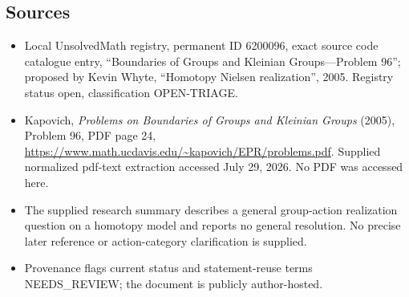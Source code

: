 \documentclass[11pt]{article}
\begin{document}
\subsection{Sources}
\begin{itemize}
\item Local UnsolvedMath registry, permanent ID 6200096, exact source code catalogue entry, ``Boundaries of Groups and Kleinian Groups---Problem 96''; proposed by Kevin Whyte, ``Homotopy Nielsen realization'', 2005. Registry status open, classification OPEN-TRIAGE.
\item Kapovich, \emph{Problems on Boundaries of Groups and Kleinian Groups} (2005), Problem 96, PDF page 24, \url{https://www.math.ucdavis.edu/~kapovich/EPR/problems.pdf}. Supplied normalized pdf-text extraction accessed July 29, 2026. No PDF was accessed here.
\item The supplied research summary describes a general group-action realization question on a homotopy model and reports no general resolution. No precise later reference or action-category clarification is supplied.
\item Provenance flags current status and statement-reuse terms NEEDS\_REVIEW; the document is publicly author-hosted.
\end{itemize}
\end{document}
